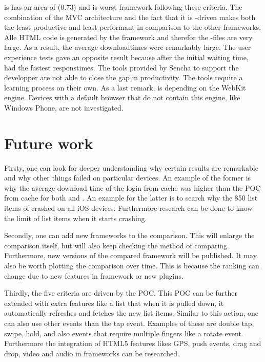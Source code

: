 \documentclass[a4paper]{artikel3}
\begin{document}
\sta {} is has an area of ($0.73$) and is worst framework following these criteria.
The combination of the MVC architecture and the fact that it is \js-driven makes \sta{} both the least productive and least performant in comparison to the other frameworks.
Alle HTML code is generated by the framework and therefor the \js-files are very large.
As a result,  the average downloadtimes were remarkably large.
The user experience tests gave an opposite result because after the initial waiting time,  \sta{} had the fastest responstimes.
The tools provided by Sencha to support the developper are not able to close the gap in productivity.
The tools require a learning process on their own.
As a last remark,  \sta{} is depending on the WebKit engine.
Devices with a default browser that do not contain this engine,  like Windows Phone, are not investigated.


\section{Future work} %
\label{sec:future_work}
Firsty, one can look for deeper understanding why certain results are remarkable and why other things failed on particular devices.
An example of the former is why the average download time of the login from cache was higher than the POC from cache for both \jqma{} and \lungo{}.
An example for the latter is to search why the 850 list items of \kendob{} crashed on all iOS devices.
Furthermore research can be done to know the limit of list items when it starts crashing.

Secondly, one can add new frameworks to the comparison.
This will enlarge the comparison itself, but will also keep checking the method of comparing.
Furthermore, new versions of the compared framework will be published.
It may also be worth plotting the comparison over time.
This is because the ranking can change due to new features in framework or new plugins.

Thirdly, the five criteria are driven by the POC.
This POC can be further extended with extra features like a list that when it is pulled down, it automatically refreshes and fetches the new list items.
Similar to this action, one can also use other events than the tap event.
Examples of these are double tap, swipe, hold, and also events that require multiple fingers like a rotate event.
Furthermore the integration of HTML5 features likes GPS, push events, drag and drop, video and audio in frameworks can be researched.
\end{document}
